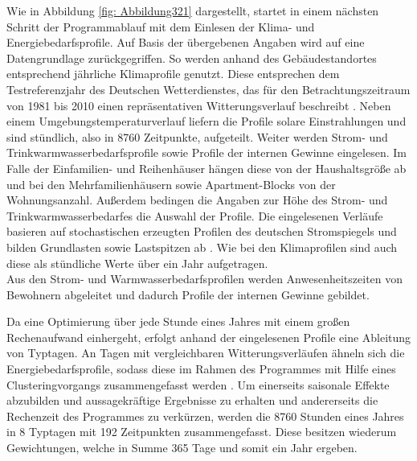 Wie in Abbildung \ref{fig: Abbildung321} dargestellt, startet in einem nächsten Schritt der Programmablauf mit dem Einlesen der Klima- und Energiebedarfsprofile.
Auf Basis der übergebenen Angaben wird auf eine Datengrundlage zurückgegriffen.
So werden anhand des Gebäudestandortes entsprechend jährliche Klimaprofile genutzt.
Diese entsprechen dem Testreferenzjahr des Deutschen Wetterdienstes, das für den Betrachtungszeitraum von 1981 bis 2010 einen repräsentativen Witterungsverlauf beschreibt \cite{try}.
Neben einem Umgebungstemperaturverlauf liefern die Profile solare Einstrahlungen und sind stündlich, also in 8760 Zeitpunkte, aufgeteilt.
Weiter werden Strom- und Trinkwarmwasserbedarfsprofile sowie Profile der internen Gewinne eingelesen.
Im Falle der Einfamilien- und Reihenhäuser hängen diese von der Haushaltsgröße ab und bei den Mehrfamilienhäusern sowie Apartment-Blocks von der Wohnungsanzahl.
Außerdem bedingen die Angaben zur Höhe des Strom- und Trinkwarmwasserbedarfes die Auswahl der Profile.
Die eingelesenen Verläufe basieren auf stochastischen erzeugten Profilen des deutschen Stromspiegels und bilden Grundlasten sowie Lastspitzen ab \cite{stromspiegel}.
Wie bei den Klimaprofilen sind auch diese als stündliche Werte über ein Jahr aufgetragen.\\
Aus den Strom- und Warmwasserbedarfsprofilen werden Anwesenheitszeiten von Bewohnern abgeleitet und dadurch Profile der internen Gewinne gebildet.

Da eine Optimierung über jede Stunde eines Jahres mit einem großen Rechenaufwand einhergeht, erfolgt anhand der eingelesenen Profile eine Ableitung von Typtagen.
An Tagen mit vergleichbaren Witterungsverläufen ähneln sich die Energiebedarfsprofile, sodass diese im Rahmen des Programmes mit Hilfe eines Clusteringvorgangs zusammengefasst werden \cite{Dubielzig.2007}.
Um einerseits saisonale Effekte abzubilden und aussagekräftige Ergebnisse zu erhalten und andererseits die Rechenzeit des Programmes zu verkürzen, werden die 8760 Stunden eines Jahres in 8 Typtagen mit 192 Zeitpunkten zusammengefasst.
Diese besitzen wiederum Gewichtungen, welche in Summe 365 Tage und somit ein Jahr ergeben.

